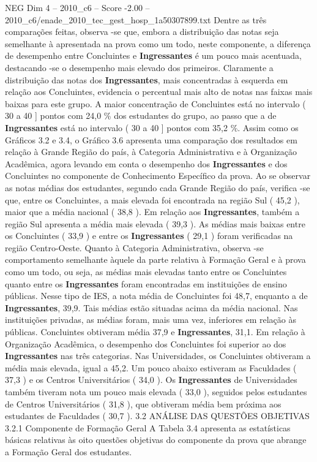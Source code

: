 \begin{textsample}{NEG Dim 4 – 2010\_c6 – Score -2.00 – 2010\_c6/enade\_2010\_tec\_gest\_hosp\_1a50307899.txt}
Dentre as três comparações feitas, observa -se que, embora a distribuição das notas seja semelhante à apresentada na prova como um todo, neste componente, a diferença de desempenho entre Concluintes e \textbf{Ingressantes} é um pouco mais acentuada, destacando -se o desempenho mais elevado dos primeiros.
Claramente a distribuição das notas dos \textbf{Ingressantes}, mais concentradas à esquerda em relação aos Concluintes, evidencia o percentual mais alto de notas nas faixas mais baixas para este grupo.
A maior concentração de Concluintes está no intervalo ( 30 a 40 ] pontos com 24,0 \% dos estudantes do grupo, ao passo que a de \textbf{Ingressantes} está no intervalo ( 30 a 40 ] pontos com 35,2 \%.
Assim como os Gráficos 3.2 e 3.4, o Gráfico 3.6 apresenta uma comparação dos resultados em relação à Grande Região do país, à Categoria Administrativa e à Organização Acadêmica, agora levando em conta o desempenho dos \textbf{Ingressantes} e dos Concluintes no componente de Conhecimento Específico da prova.
Ao se observar as notas médias dos estudantes, segundo cada Grande Região do país, verifica -se que, entre os Concluintes, a mais elevada foi encontrada na região Sul ( 45,2 ), maior que a média nacional ( 38,8 ).
Em relação aos \textbf{Ingressantes}, também a região Sul apresenta a média mais elevada ( 39,3 ).
As médias mais baixas entre os Concluintes ( 33,9 ) e entre os \textbf{Ingressantes} ( 29,1 ) foram verificadas na região Centro-Oeste.
Quanto à Categoria Administrativa, observa -se comportamento semelhante àquele da parte relativa à Formação Geral e à prova como um todo, ou seja, as médias mais elevadas tanto entre os Concluintes quanto entre os \textbf{Ingressantes} foram encontradas em instituições de ensino públicas.
Nesse tipo de IES, a nota média de Concluintes foi 48,7, enquanto a de \textbf{Ingressantes}, 39,9.
Tais médias estão situadas acima da média nacional.
Nas instituições privadas, as médias foram, mais uma vez, inferiores em relação às públicas.
Concluintes obtiveram média 37,9 e \textbf{Ingressantes}, 31,1.
Em relação à Organização Acadêmica, o desempenho dos Concluintes foi superior ao dos \textbf{Ingressantes} nas três categorias.
Nas Universidades, os Concluintes obtiveram a média mais elevada, igual a 45,2.
Um pouco abaixo estiveram as Faculdades ( 37,3 ) e os Centros Universitários ( 34,0 ).
Os \textbf{Ingressantes} de Universidades também tiveram nota um pouco mais elevada ( 33,0 ), seguidos pelos estudantes de Centros Universitários ( 31,8 ), que obtiveram média bem próxima aos estudantes de Faculdades ( 30,7 ). 3.2 ANÁLISE DAS QUESTÕES OBJETIVAS 3.2.1 Componente de Formação Geral A Tabela 3.4 apresenta as estatísticas básicas relativas às oito questões objetivas do componente da prova que abrange a Formação Geral dos estudantes.

\end{textsample}
